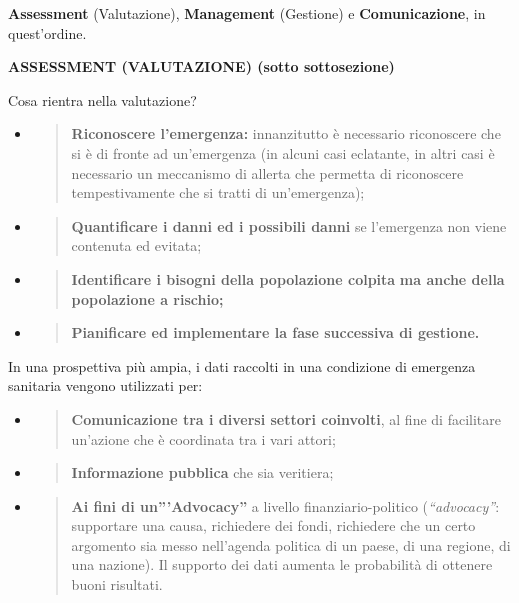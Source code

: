 \documentclass[]{article}
\begin{document}
\textbf{Assessment} (Valutazione), \textbf{Management} (Gestione) e
\textbf{Comunicazione}, in quest'ordine.

\textbf{ASSESSMENT (VALUTAZIONE) (sotto sottosezione)}

Cosa rientra nella valutazione?

\begin{itemize}
\item
  \begin{quote}
  \textbf{Riconoscere l'emergenza:} innanzitutto è necessario
  riconoscere che si è di fronte ad un'emergenza (in alcuni casi
  eclatante, in altri casi è necessario un meccanismo di allerta che
  permetta di riconoscere tempestivamente che si tratti di
  un'emergenza);
  \end{quote}
\item
  \begin{quote}
  \textbf{Quantificare i danni ed i possibili danni} se l'emergenza non
  viene contenuta ed evitata;
  \end{quote}
\item
  \begin{quote}
  \textbf{Identificare i bisogni della popolazione colpita} \textbf{ma
  anche della popolazione a rischio;}
  \end{quote}
\item
  \begin{quote}
  \textbf{Pianificare ed implementare la fase successiva di gestione.}
  \end{quote}
\end{itemize}

In una prospettiva più ampia, i dati raccolti in una condizione di
emergenza sanitaria vengono utilizzati per:

\begin{itemize}
\item
  \begin{quote}
  \textbf{Comunicazione tra i diversi settori coinvolti}, al fine di
  facilitare un'azione che è coordinata tra i vari attori;
  \end{quote}
\item
  \begin{quote}
  \textbf{Informazione pubblica} che sia veritiera;
  \end{quote}
\item
  \begin{quote}
  \textbf{Ai fini di un'''Advocacy''} a livello finanziario-politico
  (\emph{``advocacy''}: supportare una causa, richiedere dei fondi,
  richiedere che un certo argomento sia messo nell'agenda politica di un
  paese, di una regione, di una nazione). Il supporto dei dati aumenta
  le probabilità di ottenere buoni risultati.
  \end{quote}
\end{itemize}
\end{document}
